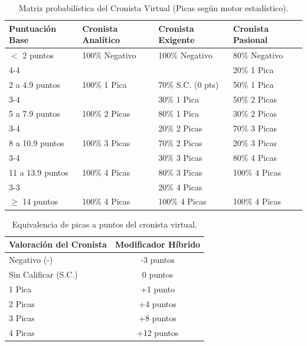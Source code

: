 \begin{table}[H]
    \centering
    \small
    \begin{tabular}{|p{2.6cm}|p{3.3cm}|p{3.3cm}|p{3.3cm}|}
        \hline
        \textbf{Puntuación Base} & \textbf{Cronista Analítico} & \textbf{Cronista Exigente} & \textbf{Cronista Pasional} \\
        \hline
        $<$ 2 puntos & 100\% Negativo & 100\% Negativo & 80\% Negativo \\ \cline{4-4}
         & & & 20\% 1 Pica \\ 
        \hline
        2 a 4.9 puntos & 100\% 1 Pica & 70\% S.C. (0 pts) & 50\% 1 Pica \\ \cline{3-4}
         & & 30\% 1 Pica & 50\% 2 Picas \\ 
        \hline
        5 a 7.9 puntos & 100\% 2 Picas & 80\% 1 Pica & 30\% 2 Picas \\ \cline{3-4}
         & & 20\% 2 Picas & 70\% 3 Picas \\ 
        \hline
        8 a 10.9 puntos & 100\% 3 Picas & 70\% 2 Picas & 20\% 3 Picas \\ \cline{3-4}
         & & 30\% 3 Picas & 80\% 4 Picas \\ 
        \hline
        11 a 13.9 puntos & 100\% 4 Picas & 80\% 3 Picas & 100\% 4 Picas \\ \cline{3-3}
         & & 20\% 4 Picas & \\ 
        \hline
        $\geq$ 14 puntos & 100\% 4 Picas & 100\% 4 Picas & 100\% 4 Picas \\
        \hline
    \end{tabular}
    \caption{Matriz probabilística del Cronista Virtual (Picas según motor estadístico).}
    \label{tab:cronistas_gdd}
\end{table}

\begin{table}[H]
    \centering
    \begin{tabular}{|p{5.5cm}|c|}
        \hline
        \textbf{Valoración del Cronista} & \textbf{Modificador Híbrido} \\
        \hline
        Negativo (-) & -3 puntos \\ \hline
        Sin Calificar (S.C.) & 0 puntos \\ \hline
        1 Pica & +1 punto \\ \hline
        2 Picas & +4 puntos \\ \hline
        3 Picas & +8 puntos \\ \hline
        4 Picas & +12 puntos \\
        \hline
    \end{tabular}
    \caption{Equivalencia de picas a puntos del cronista virtual.}
    \label{tab:conversion_hibrida_gdd}
\end{table}

